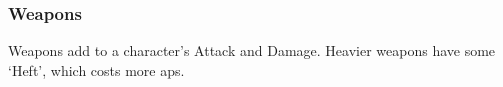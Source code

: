 \subsubsection*{Weapons}

Weapons add to a character's Attack and Damage.
Heavier weapons have some `Heft', which costs more \glspl{ap}.

\commonWeaponsChart
